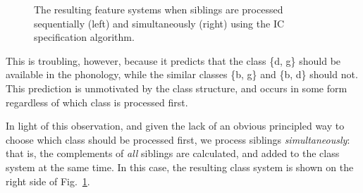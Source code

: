 \documentclass[12pt, oneside]{article}   	%
\begin{document}
\begin{figure}[h]
	\centering
	\qquad
	\caption{The resulting feature systems when siblings are processed sequentially (left) and simultaneously (right) using the IC specification algorithm.}
	\label{fig:siblingoutput}
\end{figure}


This is troubling, however, because it predicts that the class \{d, g\} should be available in the phonology, while the similar classes \{b, g\} and \{b, d\} should not. This prediction is unmotivated by the class structure, and occurs in some form regardless of which class is processed first.


In light of this observation, and given the lack of an obvious principled way to choose which class should be processed first, we process siblings \textit{simultaneously}: that is, the complements of \textit{all} siblings are calculated, and added to the class system at the same time. In this case, the resulting class system is shown on the right side of Fig.~\ref{fig:siblingoutput}.
\end{document}

